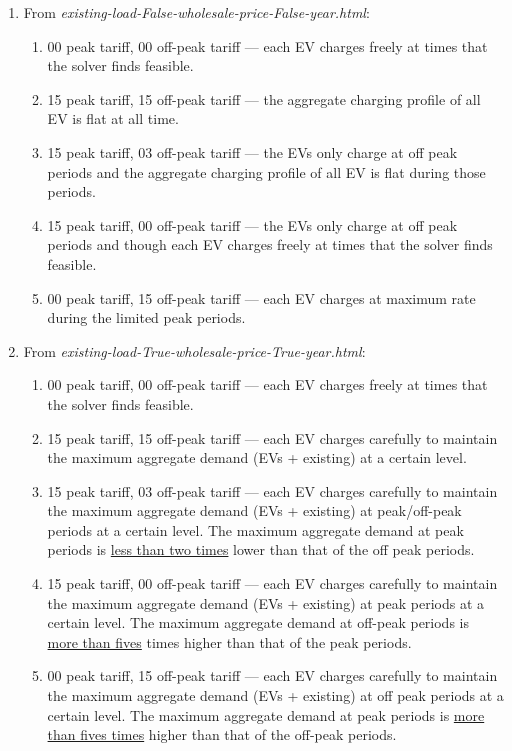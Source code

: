 \documentclass[a4paper]{llncs}
\begin{document}
\begin{enumerate}
	\item From \textit{existing-load-False-wholesale-price-False-year.html}:
	
	\begin{enumerate}
		\item 00 peak tariff, 00 off-peak tariff --- each EV charges freely at times that the solver finds feasible. 
		\item 15 peak tariff, 15 off-peak tariff --- the aggregate charging profile of all EV is flat at all time. 
		\item 15 peak tariff, 03 off-peak tariff --- the EVs only charge at off peak periods and the aggregate charging profile of all EV is flat during those periods. 
		\item 15 peak tariff, 00 off-peak tariff --- the EVs only charge at off peak periods and though each EV charges freely at times that the solver finds feasible.
		\item 00 peak tariff, 15 off-peak tariff --- each EV charges at maximum rate during the limited peak periods. 
	\end{enumerate}

	\item From \textit{existing-load-True-wholesale-price-True-year.html}:
	
		\begin{enumerate}
		\item 00 peak tariff, 00 off-peak tariff --- each EV charges freely at times that the solver finds feasible. 
		\item 15 peak tariff, 15 off-peak tariff --- each EV charges carefully to maintain the maximum aggregate demand (EVs + existing) at a certain level.
		\item 15 peak tariff, 03 off-peak tariff --- each EV charges carefully to maintain the maximum aggregate demand (EVs + existing) at peak/off-peak periods at a certain level. The maximum aggregate demand at peak periods is \underline{less than two times} lower than that of the off peak periods. 
		\item 15 peak tariff, 00 off-peak tariff --- each EV charges carefully to maintain the maximum aggregate demand (EVs + existing) at peak periods at a certain level. The maximum aggregate demand at off-peak periods is \underline{more than fives} times higher than that of the peak periods.
		\item 00 peak tariff, 15 off-peak tariff --- each EV charges carefully to maintain the maximum aggregate demand (EVs + existing) at off peak periods at a certain level. The maximum aggregate demand at peak periods is \underline{more than fives times} higher than that of the off-peak periods. 
	\end{enumerate}


\end{enumerate}
\end{document}

